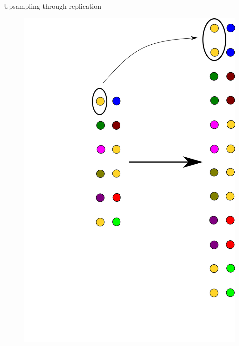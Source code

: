 \documentclass[xcolor=pdftex,dvipsnames,table,mathserif]{beamer}
\begin{document}
\begin{frame}{Upsampling through replication}

  \begin{figure}
      \includegraphics[height=\textheight]{upsampling.png}
    \end{figure}

\end{frame}
\end{document}
